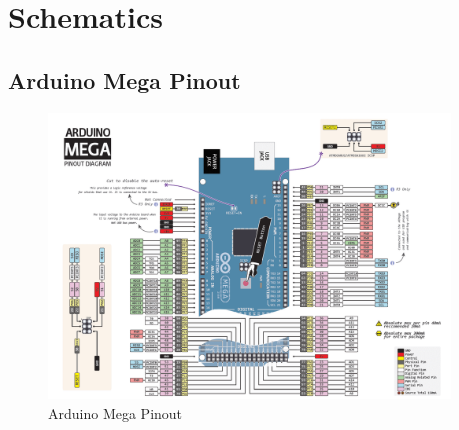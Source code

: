 \pagebreak
\section{Schematics}
\subsection{Arduino Mega Pinout} 
\label{megaPinout}
\vspace{-2cm}
\begin{figure}[H]
	\centering
\includegraphics[angle=90,origin=c,width=0.95\textwidth]{figures/megaPinout.png}
	\caption{Arduino Mega Pinout \cite{Atmega}}
	\label{megaPinoutPic}
\end{figure}\vspace{-5mm}
